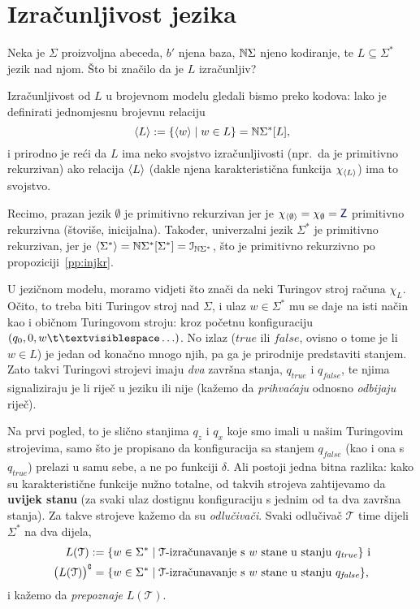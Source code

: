 \section{Izračunljivost jezika}\label{sec:Todl}

Neka je $\Sigma$ proizvoljna abeceda, $b'$ njena baza, ${\mathbb N}\Sigma$ njeno kodiranje, te $L\subseteq\Sigma^*$ jezik nad njom. Što bi značilo da je $L$ izračunljiv?

Izračunljivost od $L$ u brojevnom modelu gledali bismo preko kodova: lako je definirati jednomjesnu brojevnu relaciju
\begin{equation}\label{eq:kodLdef}
    \langle L\rangle:=\{\langle w\rangle\mid w\in L\}={\mathbb N}\Sigma^*[L]\text,
\end{equation}
i prirodno je reći da $L$ ima neko svojstvo izračunljivosti (npr.\ da je primitivno rekurzivan) ako relacija $\langle L\rangle$ (dakle njena karakteristična funkcija $\chi_{\langle L\rangle}$) ima to svojstvo.

Recimo, prazan jezik $\emptyset$ je primitivno rekurzivan jer je $\chi_{\kr\emptyset}=\chi_\emptyset=\f Z$ primitivno rekurzivna (štoviše, inicijalna). Također, univerzalni jezik $\Sigma^*$ je primitivno rekurzivan, jer je $\langle\Sigma^*\rangle={\mathbb N}\Sigma^*[\Sigma^*]=\mathcal I_{{\mathbb N}\Sigma^*}$, što je primitivno rekurzivno po propoziciji~\ref{pp:injkr}.

U jezičnom modelu, moramo vidjeti što znači da neki Turingov stroj računa $\chi_L$. Očito, to treba biti Turingov stroj nad $\Sigma$, i ulaz $w\in\Sigma^*$ mu se daje na isti način kao i običnom Turingovom stroju: kroz početnu konfiguraciju $(q_0,0,w\bl\ldots)$. No izlaz ($\mathit{true}$ ili $\mathit{false}$, ovisno o tome je li $w\in L$) je jedan od konačno mnogo njih, pa ga je prirodnije predstaviti stanjem. Zato takvi Turingovi strojevi imaju \emph{dva} završna stanja, $q_{\mathit{true}}$ i $q_{\mathit{false}}$, te njima signaliziraju je li riječ u jeziku ili nije (kažemo da \emph{prihvaćaju} odnosno \emph{odbijaju} riječ).

Na prvi pogled, to je slično stanjima $q_z$ i $q_x$ koje smo imali u našim Turingovim strojevima, samo što je propisano da konfiguracija sa stanjem $q_{\mathit{false}}$ (kao i ona s $q_{\mathit{true}}$) prelazi u samu sebe, a ne po funkciji $\delta$. Ali postoji jedna bitna razlika: kako su karakteristične funkcije nužno totalne, od takvih strojeva zahtijevamo da \textbf{uvijek stanu} (za svaki ulaz dostignu konfiguraciju s jednim od ta dva završna stanja). Za takve strojeve kažemo da su \emph{odlučivači}. Svaki odlučivač $\mathcal T$ time dijeli $\Sigma^*$ na dva dijela,
\begin{align}
    L(\mathcal T):=\{w\in\Sigma^*&\mid\text{$\mathcal T$-izračunavanje s $w$ stane u stanju $q_{\mathit{true}}$}\}
    \text{ i}\\ \bigl(L(\mathcal T)\big)\sp{{\scriptscriptstyle\complement}}=\{w\in\Sigma^*&\mid\text{$\mathcal T$-izračunavanje s $w$ stane u stanju $q_{\mathit{false}}$}\}\text,
\end{align} i kažemo da \emph{prepoznaje} $L(\mathcal T)$.

